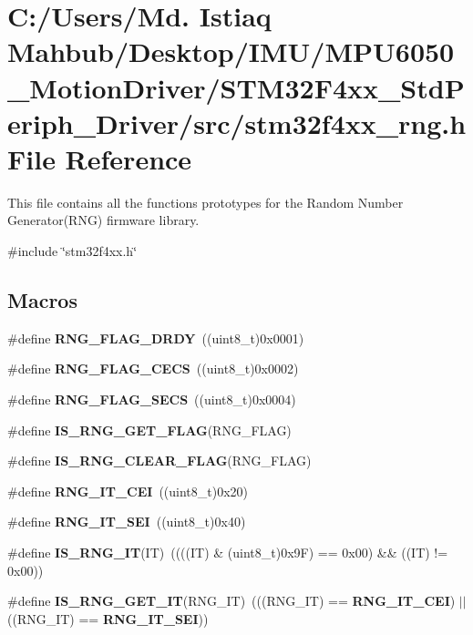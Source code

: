 \section{C\+:/\+Users/\+Md. Istiaq Mahbub/\+Desktop/\+I\+M\+U/\+M\+P\+U6050\+\_\+\+Motion\+Driver/\+S\+T\+M32\+F4xx\+\_\+\+Std\+Periph\+\_\+\+Driver/src/stm32f4xx\+\_\+rng.h File Reference}
\label{stm32f4xx__rng_8h}


This file contains all the functions prototypes for the Random Number Generator(\+R\+N\+G) firmware library.  


{\ttfamily \#include \char`\"{}stm32f4xx.\+h\char`\"{}}\newline
\subsection*{Macros}
\begin{DoxyCompactItemize}
\item 
\#define \textbf{ R\+N\+G\+\_\+\+F\+L\+A\+G\+\_\+\+D\+R\+DY}~((uint8\+\_\+t)0x0001)
\item 
\#define \textbf{ R\+N\+G\+\_\+\+F\+L\+A\+G\+\_\+\+C\+E\+CS}~((uint8\+\_\+t)0x0002)
\item 
\#define \textbf{ R\+N\+G\+\_\+\+F\+L\+A\+G\+\_\+\+S\+E\+CS}~((uint8\+\_\+t)0x0004)
\item 
\#define \textbf{ I\+S\+\_\+\+R\+N\+G\+\_\+\+G\+E\+T\+\_\+\+F\+L\+AG}(R\+N\+G\+\_\+\+F\+L\+AG)
\item 
\#define \textbf{ I\+S\+\_\+\+R\+N\+G\+\_\+\+C\+L\+E\+A\+R\+\_\+\+F\+L\+AG}(R\+N\+G\+\_\+\+F\+L\+AG)
\item 
\#define \textbf{ R\+N\+G\+\_\+\+I\+T\+\_\+\+C\+EI}~((uint8\+\_\+t)0x20)
\item 
\#define \textbf{ R\+N\+G\+\_\+\+I\+T\+\_\+\+S\+EI}~((uint8\+\_\+t)0x40)
\item 
\#define \textbf{ I\+S\+\_\+\+R\+N\+G\+\_\+\+IT}(IT)~((((IT) \& (uint8\+\_\+t)0x9\+F) == 0x00) \&\& ((\+I\+T) != 0x00))
\item 
\#define \textbf{ I\+S\+\_\+\+R\+N\+G\+\_\+\+G\+E\+T\+\_\+\+IT}(R\+N\+G\+\_\+\+IT)~(((R\+N\+G\+\_\+\+IT) == \textbf{ R\+N\+G\+\_\+\+I\+T\+\_\+\+C\+EI}) $\vert$$\vert$ ((R\+N\+G\+\_\+\+IT) == \textbf{ R\+N\+G\+\_\+\+I\+T\+\_\+\+S\+EI}))
\end{DoxyCompactItemize}
